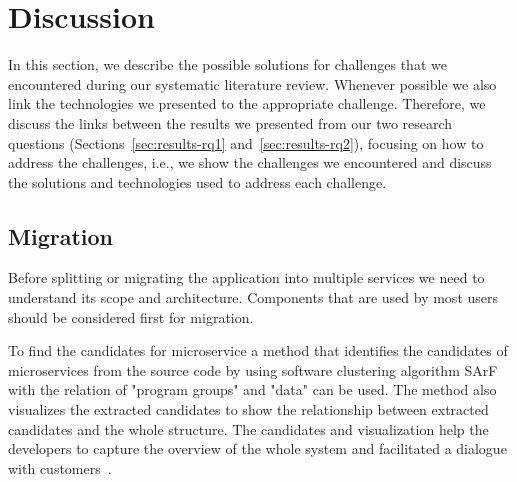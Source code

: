 
\section{Discussion}\label{sec:discussion}



In this section, we describe the possible solutions for challenges that we encountered during our systematic literature review. Whenever possible we also link the technologies we presented to the appropriate challenge. Therefore, we discuss the links between the results we presented from our two research questions (Sections~\ref{sec:results-rq1} and~\ref{sec:results-rq2}), focusing on how to address the challenges, i.e., we show the challenges we encountered and discuss the solutions and technologies used to address each challenge.

\subsection{Migration}%

\par Before splitting or migrating the application into multiple services we need to understand its scope and architecture. Components that are used by most users should be considered first for migration. 

\par To find the candidates for microservice a method that identifies the candidates of microservices from the source code by using software clustering algorithm SArF with the relation of "program groups" and "data" can be used. The method also visualizes the extracted candidates to show the relationship between extracted candidates and the whole structure. The candidates and visualization help the developers to capture the overview of the whole system and facilitated a dialogue with customers~\cite{Kamimura2018}.

